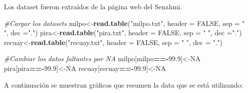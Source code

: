 \documentclass{article}
\newenvironment{Shaded}{\begin{snugshade}}{\end{snugshade}}
\newcommand{\CommentTok}[1]{\textcolor[rgb]{0.56,0.35,0.01}{\textit{#1}}}
\newcommand{\DataTypeTok}[1]{\textcolor[rgb]{0.13,0.29,0.53}{#1}}
\newcommand{\FloatTok}[1]{\textcolor[rgb]{0.00,0.00,0.81}{#1}}
\newcommand{\KeywordTok}[1]{\textcolor[rgb]{0.13,0.29,0.53}{\textbf{#1}}}
\newcommand{\NormalTok}[1]{#1}
\newcommand{\OperatorTok}[1]{\textcolor[rgb]{0.81,0.36,0.00}{\textbf{#1}}}
\newcommand{\OtherTok}[1]{\textcolor[rgb]{0.56,0.35,0.01}{#1}}
\newcommand{\StringTok}[1]{\textcolor[rgb]{0.31,0.60,0.02}{#1}}
\begin{document}
Los dataset fueron extraídos de la página web del Senahmi.

\begin{Shaded}
\begin{Highlighting}[]
\CommentTok{#Cargar los datasets}
\NormalTok{milpo<-}\KeywordTok{read.table}\NormalTok{(}\StringTok{"milpo.txt"}\NormalTok{, }\DataTypeTok{header =} \OtherTok{FALSE}\NormalTok{, }\DataTypeTok{sep =} \StringTok{" "}\NormalTok{, }\DataTypeTok{dec =}\StringTok{"."}\NormalTok{)}
\NormalTok{pira<-}\KeywordTok{read.table}\NormalTok{(}\StringTok{"pira.txt"}\NormalTok{, }\DataTypeTok{header =} \OtherTok{FALSE}\NormalTok{, }\DataTypeTok{sep =} \StringTok{" "}\NormalTok{, }\DataTypeTok{dec =}\StringTok{"."}\NormalTok{)}
\NormalTok{recuay<-}\KeywordTok{read.table}\NormalTok{(}\StringTok{"recuay.txt"}\NormalTok{, }\DataTypeTok{header =} \OtherTok{FALSE}\NormalTok{, }\DataTypeTok{sep =} \StringTok{" "}\NormalTok{, }\DataTypeTok{dec =} \StringTok{"."}\NormalTok{)}
\end{Highlighting}
\end{Shaded}

\begin{Shaded}
\begin{Highlighting}[]
\CommentTok{#Cambiar los datos faltantes por NA}
\NormalTok{milpo[milpo}\OperatorTok{==-}\FloatTok{99.9}\NormalTok{]<-}\OtherTok{NA}
\NormalTok{pira[pira}\OperatorTok{==-}\FloatTok{99.9}\NormalTok{]<-}\OtherTok{NA}
\NormalTok{recuay[recuay}\OperatorTok{==-}\FloatTok{99.9}\NormalTok{]<-}\OtherTok{NA}
\end{Highlighting}
\end{Shaded}

A continuación se muestran gráficos que resumen la data que se está
utilizando:\\\\
\end{document}
